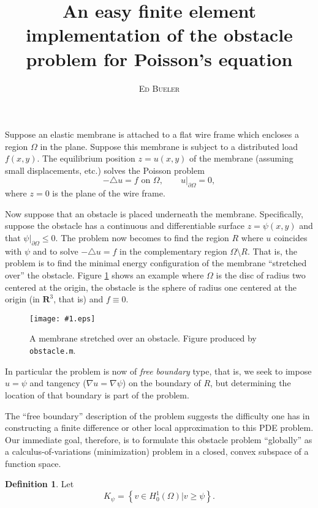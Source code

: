 \documentclass[12pt,final]{amsart}
\title{An easy finite element implementation of the obstacle problem for Poisson's equation}
\author{\textsc{Ed Bueler}}
\newcommand{\regfigure}[2]{\texttt{[image: \#1.eps]}}
\newcommand{\mtt}{\texttt}
\theoremstyle{definition}
\newtheorem*{defn}{Definition}
\newcommand{\grad}{\nabla}
\newcommand{\lap}{\triangle}
\newcommand{\RR}{\mathbf{R}}
\begin{document}
\maketitle
\thispagestyle{empty}

\normalsize
Suppose an elastic membrane is attached to a flat wire frame which encloses a region $\Omega$ in the plane.  Suppose this membrane is subject to a distributed load $f(x,y)$.  The equilibrium position $z=u(x,y)$ of the membrane (assuming small displacements, etc.) solves the Poisson problem
\begin{equation}\label{oldPoisson}
-\lap u=f \text{ on } \Omega, \qquad u\big|_{\partial\Omega} = 0,
\end{equation}
where $z=0$ is the plane of the wire frame.

Now suppose that an obstacle is placed underneath the membrane.  Specifically, suppose the obstacle has a continuous and differentiable surface $z=\psi(x,y)$ and that $\psi\big|_{\partial\Omega} \le 0$.  The problem now becomes to find the region $R$ where $u$ coincides with $\psi$ and to solve $-\lap u=f$ in the complementary region $\Omega\setminus R$.  That is, the problem is to find the minimal energy configuration of the membrane ``stretched over'' the obstacle. Figure \ref{fig:obssphere} shows an example where $\Omega$ is the disc of radius two centered at the origin, the obstacle is the sphere of radius one centered at the origin (in $\RR^3$, that is) and $f\equiv 0$.

\begin{figure}[ht]
\regfigure{obssphere}{3}
\caption{A membrane stretched over an obstacle.  Figure produced by \mtt{obstacle.m}.} \label{fig:obssphere}
\end{figure}

In particular the problem is now of \emph{free boundary} type, that is, we seek to impose $u=\psi$ and tangency ($\grad u=\grad \psi$) on the boundary of $R$, but determining the location of that boundary is part of the problem.

The ``free boundary'' description of the problem suggests the difficulty one has in constructing a finite difference or other local approximation to this PDE problem.  Our immediate goal, therefore, is to formulate this obstacle problem ``globally'' as a calculus-of-variations (minimization) problem in a closed, convex subspace of a function space.

\begin{defn}  Let
    $$K_\psi = \left\{v\in H_0^1(\Omega) \Big| v\ge \psi\right\}.$$
\end{defn}
\end{document}
